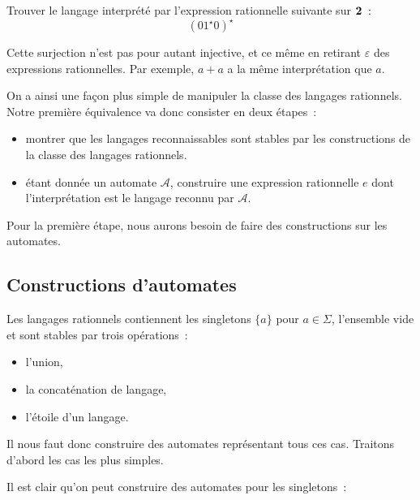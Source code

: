 \begin{exercise}
  Trouver le langage interprété par l'expression rationnelle suivante sur
  $\boldsymbol{2}$~:
  \[(01^\star 0)^\star\]
\end{exercise}

\begin{remark}
  Cette surjection n'est pas pour autant injective, et ce même en retirant
  $\varepsilon$ des expressions rationnelles. Par exemple, $a + a$ a la même
  interprétation que $a$.
\end{remark}

On a ainsi une façon plus simple de manipuler la classe des langages rationnels.
Notre première équivalence va donc consister en deux étapes~:
\begin{itemize}
\item montrer que les langages reconnaissables sont stables par les
  constructions de la classe des langages rationnels.
\item étant donnée un automate $\mathcal A$, construire une expression
  rationnelle $e$ dont l'interprétation est le langage reconnu par $\mathcal A$.
\end{itemize}

Pour la première étape, nous aurons besoin de faire des constructions sur les
automates.

\subsection{Constructions d'automates}

Les langages rationnels contiennent les singletons $\{a\}$ pour $a \in \Sigma$,
l'ensemble vide et sont stables par trois opérations~:
\begin{itemize}
\item l'union,
\item la concaténation de langage,
\item l'étoile d'un langage.
\end{itemize}

Il nous faut donc construire des automates représentant tous ces cas. Traitons
d'abord les cas les plus simples.

Il est clair qu'on peut construire des automates pour les singletons~:

\begin{figure}[h]
  \centering
\end{figure}


